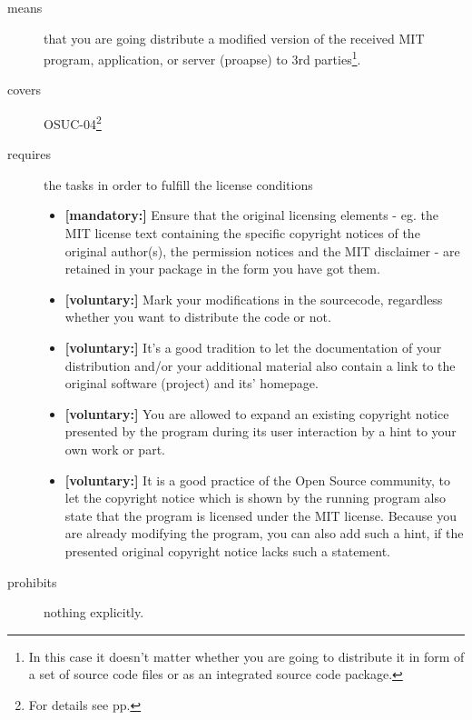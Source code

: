 \begin{description}
\item[means] that you are going distribute a modified version of the received
MIT program, application, or server (proapse) to 3rd parties\footnote{In this
case it doesn't matter whether you are going to distribute it in form of a set
of source code files or as an integrated source code package.}.
\item[covers] OSUC-04\footnote{For details see pp. \pageref{OSUC-04-DEF}}
\item[requires] the tasks in order to fulfill the license conditions
\begin{itemize}
  \item \textbf{[mandatory:]} Ensure that the original licensing elements - eg.
  the MIT license text containing the specific copyright notices of the original
  author(s), the permission notices and the MIT disclaimer - are retained in
  your package in the form you have got them.
  \item \textbf{[voluntary:]} Mark your modifications in the sourcecode,
  regardless whether you want to distribute the code or not.
  \item \textbf{[voluntary:]} It's a good tradition to let the documentation of
  your distribution and/or your additional material also contain a link to the
  original software (project) and its' homepage.
  \item \textbf{[voluntary:]} You are allowed to expand an existing copyright
  notice presented by the program during its user interaction by a hint to your
  own work or part.
  \item \textbf{[voluntary:]} It is a good practice of the Open Source
  community, to let the copyright notice which is shown by the running program
  also state that the program is licensed under the MIT license. Because you are
  already modifying the program, you can also add such a hint, if the presented
  original copyright notice lacks such a statement.
\end{itemize}
\item[prohibits] nothing explicitly.
\end{description}

